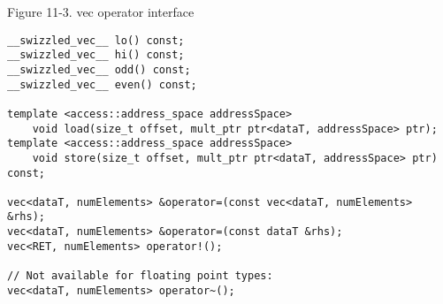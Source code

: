 \hspace*{\fill} \par %
Figure 11-3. vec operator interface
\begin{lstlisting}[caption={}]
__swizzled_vec__ lo() const; 
__swizzled_vec__ hi() const; 
__swizzled_vec__ odd() const; 
__swizzled_vec__ even() const; 

template <access::address_space addressSpace> 
	void load(size_t offset, mult_ptr ptr<dataT, addressSpace> ptr); 
template <access::address_space addressSpace>
	void store(size_t offset, mult_ptr ptr<dataT, addressSpace> ptr) const;
	
vec<dataT, numElements> &operator=(const vec<dataT, numElements> &rhs);
vec<dataT, numElements> &operator=(const dataT &rhs); 
vec<RET, numElements> operator!(); 

// Not available for floating point types:
vec<dataT, numElements> operator~();
\end{lstlisting}


